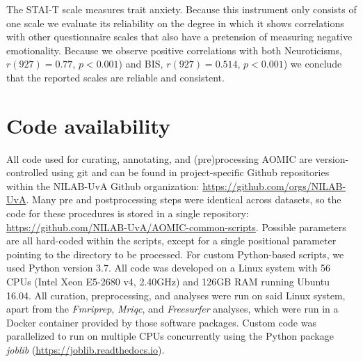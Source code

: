 \documentclass[11pt,american,]{memoir} %
\begin{document}
The STAI-T scale measures trait anxiety. Because this instrument only consists of one scale we evaluate its reliability on the degree in which it shows correlations with other questionnaire scales that also have a pretension of measuring negative emotionality. Because we observe positive correlations with both Neuroticisms, \(r(927) = 0.77\), \(p < 0.001\)) and BIS, \(r(927) = 0.514\), \(p < 0.001\)) we conclude that the reported scales are reliable and consistent.

\hypertarget{aomic-code-availability}{%
\section{Code availability}\label{aomic-code-availability}}

All code used for curating, annotating, and (pre)processing AOMIC are version-controlled using git and can be found in project-specific Github repositories within the NILAB-UvA Github organization: \url{https://github.com/orgs/NILAB-UvA}. Many pre and postprocessing steps were identical across datasets, so the code for these procedures is stored in a single repository: \url{https://github.com/NILAB-UvA/AOMIC-common-scripts}. Possible parameters are all hard-coded within the scripts, except for a single positional parameter pointing to the directory to be processed. For custom Python-based scripts, we used Python version 3.7. All code was developed on a Linux system with 56 CPUs (Intel Xeon E5-2680 v4, 2.40GHz) and 126GB RAM running Ubuntu 16.04. All curation, preprocessing, and analyses were run on said Linux system, apart from the \emph{Fmriprep}, \emph{Mriqc}, and \emph{Freesurfer} analyses, which were run in a Docker container provided by those software packages. Custom code was parallelized to run on multiple CPUs concurrently using the Python package \emph{joblib} (\url{https://joblib.readthedocs.io}).
\end{document}
